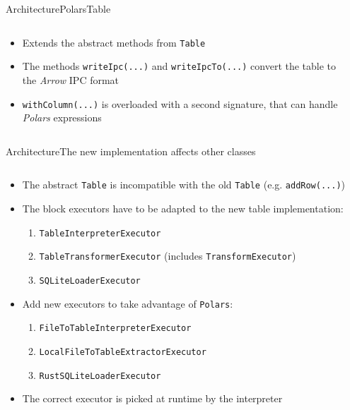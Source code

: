 \begin{frame}[t]{Architecture}{PolarsTable}
	\begin{columns}[T]
		\begin{column}{0.6\linewidth}
			\begin{itemize}
				\item Extends the abstract methods from \Verb|Table|
				\item The methods \Verb|writeIpc(...)| and \Verb|writeIpcTo(...)| convert the table to the \emph{Arrow} IPC format
				\item \Verb|withColumn(...)| is overloaded with a second signature, that can handle \emph{Polars} expressions
			\end{itemize}
		\end{column}
		\begin{column}{0.4\linewidth}
			\vfill
			\small
			
			\vfill
		\end{column}
	\end{columns}
\end{frame}
\begin{frame}[t]{Architecture}{The new implementation affects other classes}
	\begin{columns}[T]
		\begin{column}{0.5\linewidth}
			\begin{itemize}
				\item<2-> The abstract \Verb|Table| is incompatible with the old \Verb|Table| (e.g. \Verb|addRow(...)|)
				\item<3-> The block executors have to be adapted to the new table implementation:
				      \begin{enumerate}[<4->]
					      \item \Verb|TableInterpreterExecutor|
					      \item \Verb|TableTransformerExecutor| (includes \Verb|TransformExecutor|)
					      \item \Verb|SQLiteLoaderExecutor|
				      \end{enumerate}
				\item<5-> Add new executors to take advantage of \Verb|Polars|:
				      \begin{enumerate}
					      \item \Verb|FileToTableInterpreterExecutor|
					      \item \Verb|LocalFileToTableExtractorExecutor|
					      \item \Verb|RustSQLiteLoaderExecutor|
				      \end{enumerate}
				\item<6-> The correct executor is picked at runtime by the interpreter
			\end{itemize}
		\end{column}
		\hfill
		\begin{column}{0.5\linewidth}
			\only<1-2> {
				
			}
		\end{column}
	\end{columns}
\end{frame}
